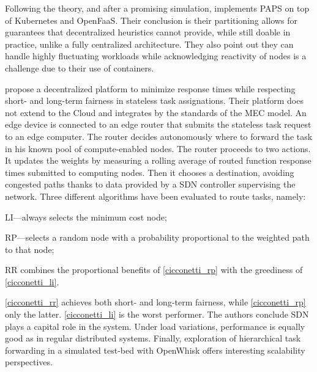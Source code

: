 \begin{description}[leftmargin=10pt]
		Following the theory, and after a promising simulation, \citet{baresi_paps_2021} implements \gls{PAPS} on top of Kubernetes and OpenFaaS. Their conclusion is their partitioning allows for guarantees that decentralized heuristics cannot provide, while still doable in practice, unlike a fully centralized architecture. They also point out they can handle highly fluctuating workloads while acknowledging reactivity of nodes is a challenge due to their use of containers.

	\item[\citet{cicconetti_decentralized_2021}] propose a decentralized platform to minimize response times while respecting short- and long-term fairness in stateless task assignations. Their platform does not extend to the Cloud and integrates by the standards of the \gls{MEC} model. An edge device is connected to an edge router that submits the stateless task request to an edge computer. The router decides autonomously where to forward the task in his known pool of compute-enabled nodes. The router proceeds to two actions. It updates the weights by measuring a rolling average of routed function response times submitted to computing nodes. Then it chooses a destination, avoiding congested paths thanks to data provided by a \gls{SDN} controller supervising the network. Three different algorithms have been evaluated to route tasks, namely:
		\begin{enumerate*}[(i)]
			\item \label{cicconetti_li} \gls{LI}—always selects the minimum cost node;
			\item \label{cicconetti_rp} \gls{RP}—selects a random node with a probability proportional to the weighted path to that node;
			\item \label{cicconetti_rr} \gls{RR} combines the proportional benefits of \cref{cicconetti_rp} with the greediness of \cref{cicconetti_li}.
		\end{enumerate*}
		\cref{cicconetti_rr} achieves both short- and long-term fairness, while \cref{cicconetti_rp} only the latter. \cref{cicconetti_li} is the worst performer.
		The authors conclude \gls{SDN} plays a capital role in the system. Under load variations, performance is equally good as in regular distributed systems. Finally, exploration of hierarchical task forwarding in a simulated test-bed with OpenWhisk offers interesting scalability perspectives.


\end{description}
